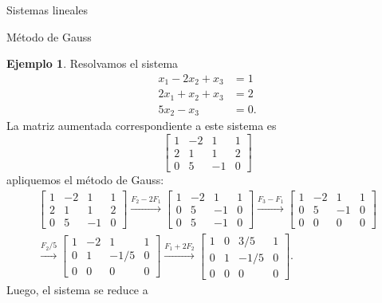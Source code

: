 \documentclass[a4paper,12pt,twoside,spanish,reqno]{amsbook}
\theoremstyle{definition}
\newtheorem{ejemplo}{Ejemplo}[section]
\theoremstyle{remark}
\begin{document}
\begin{chapter}{Sistemas lineales}
\begin{section}{Método de Gauss }
				\begin{ejemplo} Resolvamos el sistema
					\begin{align*}
					x_1 -2x_2 + x_3  &= 1\\
					2x_1 +x_2 + x_3  &= 2\\
					5x_2 - x_3  &= 0.
					\end{align*}
					La matriz  aumentada correspondiente a este sistema es
					\begin{equation*}
					 \left[\begin{array}{rrr|r} 
					 1 & -2 & 1 &  1 \\ 2 & 1 & 1 &  2 \\ 0 & 5 & -1 &  0 
					\end{array}\right]
					\end{equation*}
					apliquemos el método de Gauss:
					\begin{multline*}
					\left[\begin{array}{rrr|r}1 & -2 & 1 &  1 \\ 2 & 1 & 1 &  2 \\	0 & 5 & -1 &  0  \end{array}\right]
					\stackrel{F_2 - 2F_1}{\longrightarrow} 
					\left[\begin{array}{rrr|r}1 & -2 & 1 &  1 \\ 0 & 5 & -1 &  0 \\	0 & 5 & -1 &  0  \end{array}\right]
					\stackrel{F_3-F_1}{\longrightarrow} 
					\left[\begin{array}{rrr|r}1 & -2 & 1 &  1 \\ 0 & 5 & -1 &  0 \\	0 & 0 & 0 & 0  \end{array}\right]
					\\
					\stackrel{F_2/5}{\longrightarrow} 
					\left[\begin{array}{rrr|r}1 & -2 & 1 &  1 \\ 0 & 1 & -1/5 &  0 \\	0 & 0 & 0 &  0  \end{array}\right]
					\stackrel{F_1+2 F_2}{\longrightarrow} 
					\left[\begin{array}{rrr|r}1 & 0 & 3/5 & 1 \\ 0 & 1 & -1/5 &  0 \\	0 & 0 & 0 &  0  \end{array}\right].
					\end{multline*}	
					Luego,  el sistema se reduce  a
					\begin{align*}

\end{align*}
\end{ejemplo}
\end{section}
\end{chapter}
\end{document}
